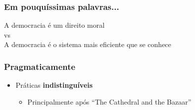 \documentclass[xcolor=dvipsnames]{beamer}
\begin{document}
\begin{frame}
	\frametitle{Em pouquíssimas palavras...}
	
\begin{center}
\huge{A democracia é um direito moral} \\[0.2cm]
\large{vs}\\[0.2cm]
\huge{A democracia é o sistema mais eficiente que se conhece}
\end{center}

\end{frame}

\begin{frame}
\frametitle{Pragmaticamente}
\begin{center}
\begin{itemize}
\item \vspace{0.1cm} Práticas {\bf indistinguíveis}
\begin{itemize}
\item Principalmente após ``The Cathedral and the Bazaar''\vspace{0.1cm}
 

\end{itemize}
\end{itemize}
\end{center}
\end{frame}
\end{document}
